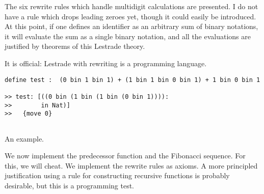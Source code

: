 \documentclass{article}
\begin{document}
The six rewrite rules which handle multidigit calculations are presented.  I do not have a rule which drops leading zeroes yet, though it could easily be introduced.  At this point, if one defines an identifier as an arbitrary sum of binary notations, it will evaluate the sum as a single binary notation, and all the evaluations are justified by theorems of this Lestrade theory.

It is official:  Lestrade with rewriting is a programming language.

\begin{verbatim}
define test :  (0 bin 1 bin 1) + (1 bin 1 bin 0 bin 1) + 1 bin 0 bin 1

>> test: [((0 bin (1 bin (1 bin (0 bin 1)))):
>>        in Nat)]
>>   {move 0}


\end{verbatim}

An example.

We now implement the predecessor function and the Fibonacci sequence.  For this, we will cheat.  We implement the rewrite rules as axioms.
A more principled justification using a rule for constructing recursive functions is probably desirable, but this is a programming test.
\end{document}
